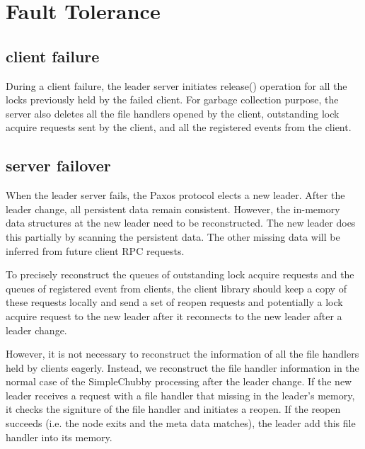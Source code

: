 \section{Fault Tolerance}
\label{section:failure}

\subsection{client failure}

During a client failure, the leader server initiates release() operation for
all the locks previously held by the failed client. For garbage collection
purpose, the server also deletes all the file handlers opened by the client,
outstanding lock acquire requests sent by the client, and all the registered
events from the client.


\subsection{server failover}

When the leader server fails, the Paxos protocol elects a new leader. After
the leader change, all persistent data remain consistent. However, the in-memory
data structures at the new leader need to be reconstructed. The new leader
does this partially by scanning the persistent data. The other missing data
will be inferred from future client RPC requests.

To precisely reconstruct the queues of outstanding lock acquire requests and
the queues of registered event from clients, the client library should keep
a copy of these requests locally and send a set of reopen requests and
potentially a lock acquire request to the new leader after it reconnects
to the new leader after a leader change.

However, it is not necessary to reconstruct the information of all the file
handlers held by clients eagerly. Instead, we reconstruct the file handler
information in the normal case of the SimpleChubby processing after the
leader change. If the new leader receives a request with a file handler that
missing in the leader's memory, it checks the signiture of the file
handler and initiates a reopen. If the reopen succeeds (i.e. the node exits
and the meta data matches), the leader add this file handler into its memory.


